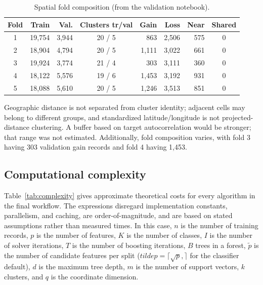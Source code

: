 \documentclass[conference]{IEEEtran}
\begin{document}
\begin{table}[t]
\caption{Spatial fold composition (from the validation notebook).}
\label{tab:folds}
\centering
\scriptsize
\setlength{\tabcolsep}{1.8pt}
\begin{tabular}{crrcrrrc}
\toprule
Fold & Train & Val. & Clusters tr/val & Gain & Loss & Near & Shared\\
\midrule
1 & 19,754 & 3,944 & 20 / 5 & 863 & 2,506 & 575 & 0\\
2 & 18,904 & 4,794 & 20 / 5 & 1,111 & 3,022 & 661 & 0\\
3 & 19,924 & 3,774 & 21 / 4 & 303 & 3,111 & 360 & 0\\
4 & 18,122 & 5,576 & 19 / 6 & 1,453 & 3,192 & 931 & 0\\
5 & 18,088 & 5,610 & 20 / 5 & 1,246 & 3,513 & 851 & 0\\
\bottomrule
\end{tabular}
\end{table}

Geographic distance is not separated from cluster identity; adjacent cells may belong to different groups, and standardized latitude/longitude is not projected-distance clustering. A buffer based on target autocorrelation would be stronger; that range was not estimated. Additionally, fold composition varies, with fold 3 having 303 validation gain records and fold 4 having 1,453.

\subsection{Computational complexity}
Table~\ref{tab:complexity} gives approximate theoretical costs for every algorithm in the final workflow. The expressions disregard implementation constants, parallelism, and caching, are order-of-magnitude, and are based on stated assumptions rather than measured times. In this case, $n$ is the number of training records, $p$ is the number of features, $K$ is the number of classes, $I$ is the number of solver iterations, $T$ is the number of boosting iterations, $B$ trees in a forest, $\tilde p$ is the number of candidate features per split ($tilde p=\lceil\sqrt p,\rceil$ for the classifier default), $d$ is the maximum tree depth, $m$ is the number of support vectors, $k$ clusters, and $q$ is the coordinate dimension.
\end{document}
